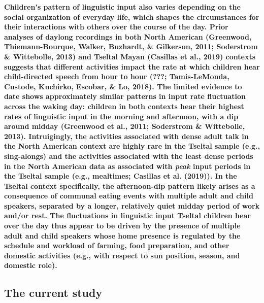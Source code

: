 \documentclass[,man,floatsintext]{apa6}
\begin{document}
\textbf{Children's pattern of linguistic input also varies depending on
the social organization of everyday life, which shapes the circumstances
for their interactions with others over the course of the day. Prior
analyses of daylong recordings in both North American (Greenwood,
Thiemann-Bourque, Walker, Buzhardt, \& Gilkerson, 2011; Soderstrom \&
Wittebolle, 2013) and Tseltal Mayan (Casillas et al., 2019) contexts
suggests that different activities impact the rate at which children
hear child-directed speech from hour to hour ({\textbf{???}};
Tamis-LeMonda, Custode, Kuchirko, Escobar, \& Lo, 2018). The limited
evidence to date shows approximately similar patterns in input rate
fluctuation across the waking day: children in both contexts hear their
highest rates of linguistic input in the morning and afternoon, with a
dip around midday (Greenwood et al., 2011; Soderstrom \& Wittebolle,
2013). Intruigingly, the activities associated with dense adult talk in
the North American context are highly rare in the Tseltal sample (e.g.,
sing-alongs) and the activities associated with the least dense periods
in the North American data as associated with \emph{peak} input periods
in the Tseltal sample (e.g., mealtimes; Casillas et al. (2019)). In the
Tseltal context specifically, the afternoon-dip pattern likely arises as
a consequence of communal eating events with multiple adult and child
speakers, separated by a longer, relatively quiet midday period of work
and/or rest. The fluctuations in linguistic input Tseltal children hear
over the day thus appear to be driven by the presence of multiple adult
and child speakers whose home presence is regulated by the schedule and
workload of farming, food preparation, and other domestic activities
(e.g., with respect to sun position, season, and domestic role).}

\subsection{The current study}\label{the-current-study}
\end{document}
